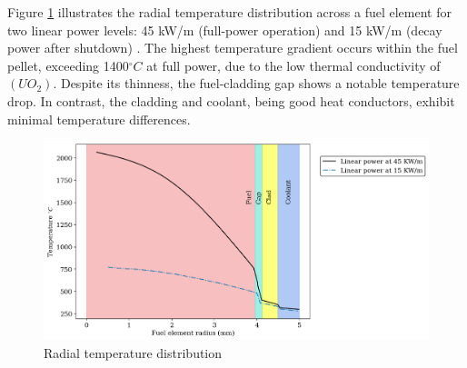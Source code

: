 \documentclass[12pt]{article}
\begin{document}
\begin{multicols}{2}
\begin{itemize}
\end{itemize}

Figure \ref{fig:fig_3} illustrates the radial temperature distribution across a fuel element for two linear power levels: 45 kW/m (full-power operation) and 15 kW/m (decay power after shutdown) \cite{popov2017th}. The highest temperature gradient occurs within the fuel pellet, exceeding 1400$^{\circ} C$ at full power, due to the low thermal conductivity of $(UO_{2})$. Despite its thinness, the fuel-cladding gap shows a notable temperature drop. In contrast, the cladding and coolant, being good heat conductors, exhibit minimal temperature differences.

\end{multicols}

\begin{figure}
    \centering
    \includegraphics[width=0.8\linewidth]{figs/ass_2_temp_profile.png}
    \caption{Radial temperature distribution}
    \label{fig:fig_3}
\end{figure}
\end{document}
